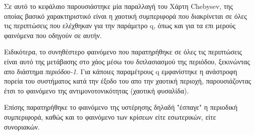 Σε αυτό το κεφάλαιο παρουσιάστηκε μία παραλλαγή του Χάρτη Chebysev, της οποίας βασικό χαρακτηριστικό είναι η χαοτική συμπεριφορά που διακρίνεται σε όλες τις περιπτώσεις που ελέχθηκαν για την παράμετρο q, όπως και για τα επι μερούς φαινόμενα που οδηγούν σε αυτήν.

Ειδικότερα, το συνηθέστερο φαινόμενο που παρατηρήθηκε σε όλες τις περιπτώσεις είναι αυτό της μετάβασης στο χάος μέσω του διπλασιασμού της περιόδου, ξεκινώντας απο διάστημα \emph{περιόδου-1}.
Για κάποιες παραμέτρους q εμφανίστηκε η ανάστροφη πορεία του συστήματος κατά την έξοδο του απο την χαοτική περιοχή, παρουσιάζοντας έτσι το φαινόμενο της αντιμονοτονικότητας (χαοτική φυσαλίδα).

Επίσης παρατηρήθηκε το φαινόμενο της υστέρησης δηλαδή "έσπαγε" η περιοδική συμπεριφορά, καθώς και το φαινόμενο των κρίσεων είτε εσωτερικών, είτε συνοριακών.

\newpage